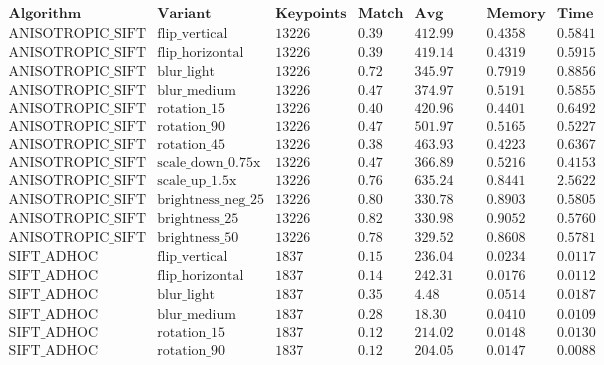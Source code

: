 \documentclass[conference]{IEEEtran}
\begin{document}
$$\begin{array}{|l|l|c|c|c|c|c|}
\hline
\textbf{Algorithm} & \textbf{Variant} & \textbf{Keypoints} & \textbf{Match Ratio} & \textbf{Avg Distance} & \textbf{Memory (MB)} & \textbf{Time (sec)} \\ \hline
\text{ANISOTROPIC\_SIFT} & \text{flip\_vertical} & 13226 & 0.39 & 412.99 & 0.4358 & 0.5841 \\
\text{ANISOTROPIC\_SIFT} & \text{flip\_horizontal} & 13226 & 0.39 & 419.14 & 0.4319 & 0.5915 \\
\text{ANISOTROPIC\_SIFT} & \text{blur\_light} & 13226 & 0.72 & 345.97 & 0.7919 & 0.8856 \\
\text{ANISOTROPIC\_SIFT} & \text{blur\_medium} & 13226 & 0.47 & 374.97 & 0.5191 & 0.5855 \\
\text{ANISOTROPIC\_SIFT} & \text{rotation\_15} & 13226 & 0.40 & 420.96 & 0.4401 & 0.6492 \\
\text{ANISOTROPIC\_SIFT} & \text{rotation\_90} & 13226 & 0.47 & 501.97 & 0.5165 & 0.5227 \\
\text{ANISOTROPIC\_SIFT} & \text{rotation\_45} & 13226 & 0.38 & 463.93 & 0.4223 & 0.6367 \\
\text{ANISOTROPIC\_SIFT} & \text{scale\_down\_0.75x} & 13226 & 0.47 & 366.89 & 0.5216 & 0.4153 \\
\text{ANISOTROPIC\_SIFT} & \text{scale\_up\_1.5x} & 13226 & 0.76 & 635.24 & 0.8441 & 2.5622 \\
\text{ANISOTROPIC\_SIFT} & \text{brightness\_neg\_25} & 13226 & 0.80 & 330.78 & 0.8903 & 0.5805 \\
\text{ANISOTROPIC\_SIFT} & \text{brightness\_25} & 13226 & 0.82 & 330.98 & 0.9052 & 0.5760 \\
\text{ANISOTROPIC\_SIFT} & \text{brightness\_50} & 13226 & 0.78 & 329.52 & 0.8608 & 0.5781 \\ \hline
\text{SIFT\_ADHOC} & \text{flip\_vertical} & 1837 & 0.15 & 236.04 & 0.0234 & 0.0117 \\
\text{SIFT\_ADHOC} & \text{flip\_horizontal} & 1837 & 0.14 & 242.31 & 0.0176 & 0.0112 \\
\text{SIFT\_ADHOC} & \text{blur\_light} & 1837 & 0.35 & 4.48 & 0.0514 & 0.0187 \\
\text{SIFT\_ADHOC} & \text{blur\_medium} & 1837 & 0.28 & 18.30 & 0.0410 & 0.0109 \\
\text{SIFT\_ADHOC} & \text{rotation\_15} & 1837 & 0.12 & 214.02 & 0.0148 & 0.0130 \\
\text{SIFT\_ADHOC} & \text{rotation\_90} & 1837 & 0.12 & 204.05 & 0.0147 & 0.0088 \\

\end{array}$$
\end{document}
